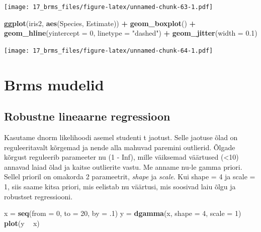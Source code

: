 \documentclass[]{book}
\newenvironment{Shaded}{\begin{snugshade}}{\end{snugshade}}
\newcommand{\DataTypeTok}[1]{\textcolor[rgb]{0.13,0.29,0.53}{#1}}
\newcommand{\DecValTok}[1]{\textcolor[rgb]{0.00,0.00,0.81}{#1}}
\newcommand{\FloatTok}[1]{\textcolor[rgb]{0.00,0.00,0.81}{#1}}
\newcommand{\KeywordTok}[1]{\textcolor[rgb]{0.13,0.29,0.53}{\textbf{#1}}}
\newcommand{\NormalTok}[1]{#1}
\newcommand{\OperatorTok}[1]{\textcolor[rgb]{0.81,0.36,0.00}{\textbf{#1}}}
\newcommand{\StringTok}[1]{\textcolor[rgb]{0.31,0.60,0.02}{#1}}
\begin{document}
\texttt{[image: 17\_brms\_files/figure-latex/unnamed-chunk-63-1.pdf]}

\begin{Shaded}
\begin{Highlighting}[]
\KeywordTok{ggplot}\NormalTok{(iris2, }\KeywordTok{aes}\NormalTok{(Species, Estimate)) }\OperatorTok{+}\StringTok{ }
\StringTok{  }\KeywordTok{geom_boxplot}\NormalTok{() }\OperatorTok{+}
\StringTok{  }\KeywordTok{geom_hline}\NormalTok{(}\DataTypeTok{yintercept =} \DecValTok{0}\NormalTok{, }\DataTypeTok{linetype =} \StringTok{"dashed"}\NormalTok{) }\OperatorTok{+}
\StringTok{  }\KeywordTok{geom_jitter}\NormalTok{(}\DataTypeTok{width =} \FloatTok{0.1}\NormalTok{)}
\end{Highlighting}
\end{Shaded}

\texttt{[image: 17\_brms\_files/figure-latex/unnamed-chunk-64-1.pdf]}

\hypertarget{brms-mudelid}{%
\chapter{Brms mudelid}\label{brms-mudelid}}

\hypertarget{robustne-lineaarne-regressioon}{%
\section{Robustne lineaarne regressioon}\label{robustne-lineaarne-regressioon}}

Kasutame dnorm likelihoodi asemel studenti t jaotust. Selle jaotuse õlad on reguleeritavalt kõrgemad ja nende alla mahuvad paremini outlierid. Õlgade kõrgust reguleerib parameeter nu (1 - Inf), mille väiksemad väärtused (\textless{}10) annavad laiad õlad ja kaitse outlierite vastu. Me anname nu-le gamma priori. Sellel prioril on omakorda 2 parameetrit, \emph{shape} ja \emph{scale}. Kui shape = 4 ja scale = 1, siis saame kitsa priori, mis eelistab nu väärtusi, mis soosivad laiu õlgu ja robustset regressiooni.

\begin{Shaded}
\begin{Highlighting}[]
\NormalTok{x =}\StringTok{ }\KeywordTok{seq}\NormalTok{(}\DataTypeTok{from =} \DecValTok{0}\NormalTok{, }\DataTypeTok{to =} \DecValTok{20}\NormalTok{, }\DataTypeTok{by =} \FloatTok{.1}\NormalTok{)}
\NormalTok{y =}\StringTok{ }\KeywordTok{dgamma}\NormalTok{(x, }\DataTypeTok{shape =} \DecValTok{4}\NormalTok{, }\DataTypeTok{scale =} \DecValTok{1}\NormalTok{)}
\KeywordTok{plot}\NormalTok{(y }\OperatorTok{~}\StringTok{ }\NormalTok{x)}
\end{Highlighting}
\end{Shaded}
\end{document}
